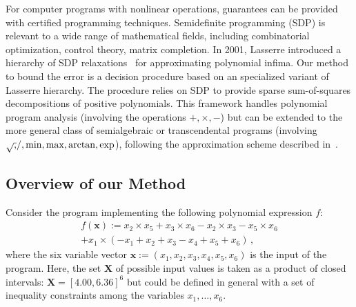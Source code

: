 \documentclass[preprint]{sigplanconf}
\newcommand{\x}{\mathbf{x}}
\def\X{\mathbf{X}}
\theoremstyle{plain}
\begin{document}
For computer programs with nonlinear operations, guarantees can be provided with certified programming techniques.
Semidefinite programming (SDP) is relevant to a wide range of mathematical fields, including combinatorial optimization, control theory, matrix completion. In 2001, Lasserre introduced a hierarchy of SDP relaxations~\cite{Lasserre01moments} for approximating polynomial infima. Our method to bound the error is a decision procedure based on an specialized variant of Lasserre hierarchy. The procedure relies on SDP to provide sparse sum-of-squares decompositions of positive polynomials. This framework handles polynomial program analysis (involving the operations $+,\times,-$) but can be extended to the more general class of semialgebraic or transcendental programs (involving $\sqrtsign, /, \min, \max, \arctan, \exp$), following the approximation scheme described in~\cite{Magron15sdp}.

\subsection{Overview of our Method}
%
Consider the program implementing the following polynomial expression $f$:
\begin{align*}
f(\x) := x_2 \times x_5 + x_3 \times x_6 - x_2 \times x_3  - x_5 \times x_6 \\
+ x_1 \times ( - x_1 +  x_2 +  x_3  - x_4 +  x_5 +  x_6) \,,
\end{align*}
%
where the six variable vector $\x :=  (x_1, x_2, x_3, x_4, x_5, x_6)$ is the input of the program. Here, the set $\X$ of possible input values is taken as a product of closed intervals: $\X = [4.00, 6.36]^6$ but could be defined in general with a set of inequality constraints among the variables $x_1, \dots, x_6$. 
\end{document}

